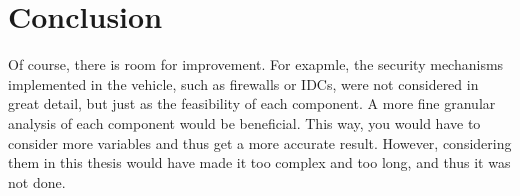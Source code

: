 \chapter{Conclusion}
\label{chp:conclusion}

Of course, there is room for improvement.
For exapmle, the security mechanisms implemented in the vehicle, such as firewalls or IDCs, were not considered in great detail, but just as the feasibility of each component.
A more fine granular analysis of each component would be beneficial. This way, you would have to consider more variables and thus get a more accurate result.
However, considering them in this thesis would have made it too complex and too long, and thus it was not done.